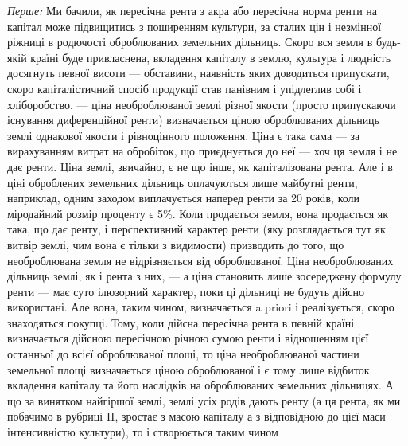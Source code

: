 \emph{Перше:} Ми бачили, як пересічна рента з акра або пересічна норма
ренти на капітал може підвищитись з поширенням культури, за сталих цін і
незмінної ріжниці в родючості оброблюваних земельних дільниць. Скоро вся
земля в будь-якій країні буде привласнена, вкладення капіталу в землю, культура
і людність досягнуть певної висоти — обставини, наявність яких доводиться
припускати, скоро капіталістичний спосіб продукції став панівним і упідлеглив
собі і хліборобство, — ціна необроблюваної землі різної якости (просто припускаючи
існування диференційної ренти) визначається ціною оброблюваних дільниць
землі однакової якости і рівноцінного положення. Ціна є така сама — за вирахуванням
витрат на обробіток, що приєднується до неї — хоч ця земля і не
дає ренти. Ціна землі, звичайно, є не що інше, як капіталізована рента. Але
і в ціні оброблених земельних дільниць оплачуються лише майбутні ренти, наприклад,
одним заходом виплачується наперед ренти за 20 років, коли міродайний
розмір проценту є 5\%. Коли продається земля, вона продається як така, що дає
ренту, і перспективний характер ренти (яку розглядається тут як витвір землі, чим
вона є тільки з видимости) призводить до того, що необроблювана земля не
відрізняється від оброблюваної. Ціна необроблюваних дільниць землі, як і рента
з них, — а ціна становить лише зосереджену формулу ренти — має суто ілюзорний
характер, поки ці дільниці не будуть дійсно використані. Але вона, таким
чином, визначається a priori і реалізується, скоро знаходяться покупці. Тому,
коли дійсна пересічна рента в певній країні визначається дійсною пересічною
річною сумою ренти і відношенням цієї останньої до всієї оброблюваної площі,
то ціна необроблюваної частини земельної площі визначається ціною оброблюваної
і є тому лише відбиток вкладення капіталу та його наслідків на оброблюваних
земельних дільницях. А що за винятком найгіршої землі, землі усіх родів
дають ренту (а ця рента, як ми побачимо в рубриці II, зростає з масою капіталу
а з відповідною до цієї маси інтенсивністю культури), то і створюється таким чином
\parbreak{}  %
